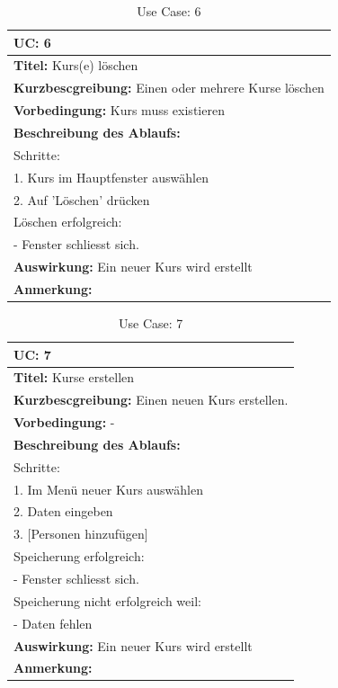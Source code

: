 %
\begin{table}[h]
\caption{Use Case: 6}
\begin{tabular}[ht]{|p{15cm}|}
  \hline
  \textbf{UC:} 6\\
  \hline
  \textbf{Titel:} Kurs(e) löschen\\
  \hline
  \textbf{Kurzbescgreibung:} Einen oder mehrere Kurse löschen\\
  \hline
  \textbf{Vorbedingung:} Kurs muss existieren\\
  \hline
  \textbf{Beschreibung des Ablaufs:}\\
Schritte:\\
1. Kurs im Hauptfenster auswählen\\
2. Auf 'Löschen' drücken\\
Löschen erfolgreich:\\
- Fenster schliesst sich.\\
  \hline
  \textbf{Auswirkung:} Ein neuer Kurs wird erstellt\\
  \hline
  \textbf{Anmerkung:}\\
  \hline
\end{tabular}
\end{table}
%
%
\begin{table}[h]
\caption{Use Case: 7}
\begin{tabular}[ht]{|p{15cm}|}
  \hline
  \textbf{UC:} 7\\
  \hline
  \textbf{Titel:} Kurse erstellen\\
  \hline
  \textbf{Kurzbescgreibung:} Einen neuen Kurs erstellen.\\
  \hline
  \textbf{Vorbedingung:} -\\
  \hline
  \textbf{Beschreibung des Ablaufs:}\\
Schritte:\\
1. Im Menü neuer Kurs auswählen\\
2. Daten eingeben\\
3. [Personen hinzufügen]\\
Speicherung erfolgreich:\\
- Fenster schliesst sich.\\
Speicherung nicht erfolgreich weil:\\
- Daten fehlen\\
  \hline
  \textbf{Auswirkung:}  Ein neuer Kurs wird erstellt\\
  \hline
  \textbf{Anmerkung:}\\
  \hline
\end{tabular}
\end{table}
